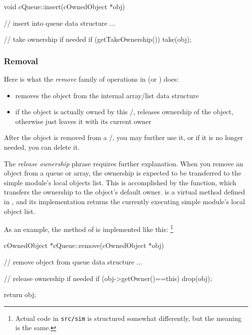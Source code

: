 \begin{cpp}
void cQueue::insert(cOwnedObject *obj)
{
    // insert into queue data structure
    ...

    // take ownership if needed
    if (getTakeOwnership())
        take(obj);

}
\end{cpp}


\subsubsection{Removal}
\label{sec:sim-lib:ownership-and-removal-from-container}

Here is what the \textit{remove} family of operations in 
(or ) does:

\begin{itemize}
    \item removes the object from the internal array/list data structure

    \item if the object is actually owned by this /,
    releases ownership of the object, otherwise just leaves it with
    its current owner
\end{itemize}

After the object is removed from a /,
you may further use it, or if it is no longer needed, you can delete it.

The \textit{release ownership} phrase requires further explanation.
When you remove an object from a queue or array, the ownership
is expected to be transferred to the simple module's local objects list.
This is accomplished by the  function, which transfers the
ownership to the object's default owner.
 is a virtual method defined in ,
and its implementation returns
the currently executing simple module's local object list.

As an example, the  method of  is
implemented like this:
  \footnote{Actual code in \texttt{src/sim} is structured somewhat
  differently, but the meaning is the same.}

\begin{cpp}
cOwnedObject *cQueue::remove(cOwnedObject *obj)
{
    // remove object from queue data structure
    ...

    // release ownership if needed
    if (obj->getOwner()==this)
        drop(obj);

    return obj;
}
\end{cpp}


